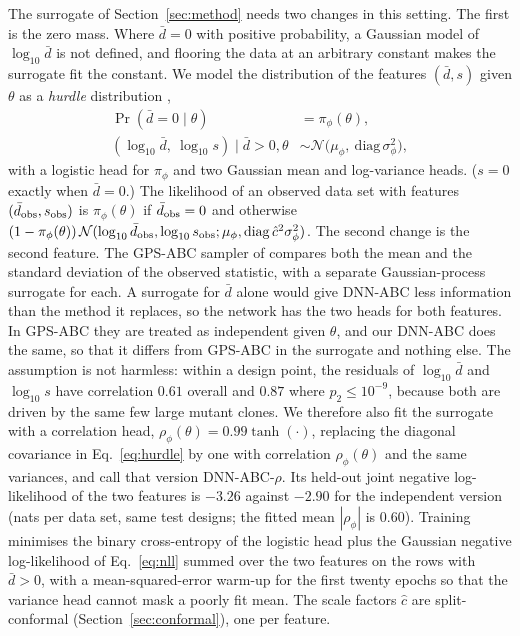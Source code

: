 \documentclass[sn-basic,iicol,pdflatex]{sn-jnl}
\begin{document}
The surrogate of Section~\ref{sec:method} needs two changes in this setting. The first is
the zero mass. Where $\bar d=0$ with positive probability, a Gaussian model of
$\log_{10}\bar d$ is not defined, and flooring the data at an arbitrary constant
makes the surrogate fit the constant. We model the distribution of the features
$(\bar d,s)$ given $\theta$ as a \emph{hurdle} distribution \citep{cragg1971,mullahy1986},
\begin{equation}
\label{eq:hurdle}
\begin{split}
\Pr(\bar d=0\mid\theta)&=\pi_\phi(\theta),\\
(\log_{10}\bar d,\ \log_{10}s)\mid\bar d>0,\theta&\sim
\mathcal N\!\big(\mu_\phi,\ \mathrm{diag}\,\sigma^2_\phi\big),
\end{split}
\end{equation}
with a logistic head for $\pi_\phi$ and two Gaussian mean and log-variance
heads. ($s=0$ exactly when $\bar d=0$.) The likelihood of an observed data set
with features $(\bar d_{\rm obs},s_{\rm obs})$ is $\pi_\phi(\theta)$ if
$\bar d_{\rm obs}=0$ and otherwise
$(1-\pi_\phi(\theta))\,\mathcal N(\log_{10}\bar d_{\rm obs},\log_{10}s_{\rm obs};\mu_\phi,\mathrm{diag}\,\hat c^2\sigma_\phi^2)$.
The second change is the second feature. The GPS-ABC sampler of
\citeauthor{lu2023} compares both the mean and the standard deviation of the
observed statistic, with a separate Gaussian-process surrogate for each. A
surrogate for $\bar d$ alone would give DNN-ABC less information than the
method it replaces, so the network has the two heads for both features. In
GPS-ABC they are treated as independent given $\theta$, and our DNN-ABC does the
same, so that it differs from GPS-ABC in the surrogate and nothing else. The
assumption is not harmless: within a design point, the residuals of
$\log_{10}\bar d$ and $\log_{10}s$ have correlation $0.61$ overall and $0.87$ where
$p_2\le10^{-9}$, because both are driven by the same few large mutant clones. We
therefore also fit the surrogate with a correlation head,
$\rho_\phi(\theta)=0.99\tanh(\cdot)$, replacing the diagonal covariance in
Eq.~\eqref{eq:hurdle} by one with correlation $\rho_\phi(\theta)$ and the same variances, and call
that version DNN-ABC-$\rho$. Its held-out joint negative log-likelihood of the two features is $-3.26$
against $-2.90$ for the independent version (nats per data set, same test designs; the
fitted mean $|\rho_\phi|$ is $0.60$). Training minimises the binary
cross-entropy of the logistic head plus the Gaussian negative log-likelihood of
Eq.~\eqref{eq:nll} summed over the two features on the rows with $\bar d>0$,
with a mean-squared-error warm-up for the first twenty epochs so that the
variance head cannot mask a poorly fit mean. The scale factors $\hat c$ are
split-conformal (Section~\ref{sec:conformal}), one per feature.
\end{document}
